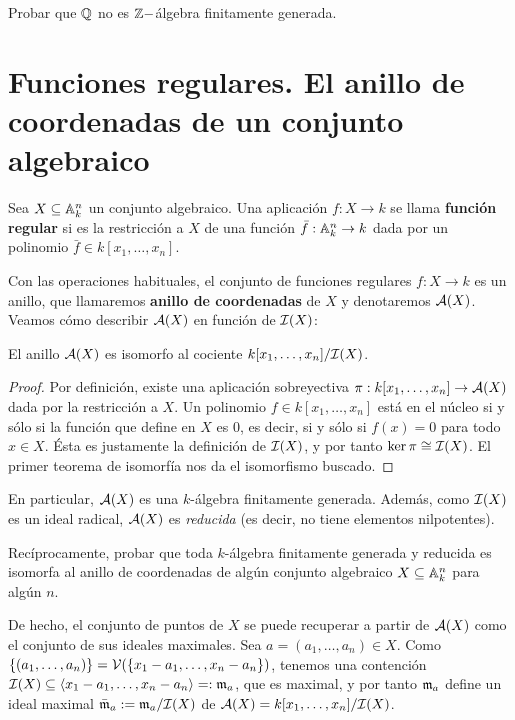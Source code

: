 \documentclass[ACGA.tex]{subfiles}
\begin{document}
\begin{ejer}
Probar que $\mathbb{Q}$ no es $\mathbb{Z}-$álgebra finitamente generada. 
\end{ejer}


\section[Funciones regulares]{Funciones regulares. El anillo de coordenadas de un conjunto algebraico}

\begin{defi}
 Sea $X\subseteq \mathbb{A}^n_k$ un conjunto algebraico. Una aplicación $f:X\to k$ se llama {\bf función regular} si es la restricción a $X$ de una función $\bar f:\mathbb{A}^n_k\to k$ dada por un polinomio $\bar f \in k[x_1,\ldots,x_n]$.
\end{defi}

Con las operaciones habituales, el conjunto de funciones regulares $f:X\to k$ es un anillo, que llamaremos {\bf anillo de coordenadas} de $X$ y denotaremos ${\mathcal A}(X)$. Veamos cómo describir ${\mathcal A}(X)$ en función de $\mathcal{I}(X)$:

\begin{prop}
 El anillo ${\mathcal A}(X)$ es isomorfo al cociente $k[x_1,\ldots,x_n]/\mathcal{I}(X)$.
\end{prop}

\begin{proof}
 Por definición, existe una aplicación sobreyectiva $\pi:k[x_1,\ldots,x_n]\to{\mathcal A}(X)$ dada por la restricción a $X$. Un polinomio $f\in k[x_1,\ldots,x_n]$ está en el núcleo si y sólo si la función que define en $X$ es $0$, es decir, si y sólo si $f(x)=0$ para todo $x\in X$. Ésta es justamente la definición de $\mathcal{I}(X)$, y por tanto $\ker\pi\cong\mathcal{I}(X)$. El primer teorema de isomorfía nos da el isomorfismo buscado.
\end{proof}

En particular, ${\mathcal A}(X)$ es una $k$-álgebra finitamente generada. Además, como $\mathcal{I}(X)$ es un ideal radical, ${\mathcal A}(X)$ es \emph{reducida} (es decir, no tiene elementos nilpotentes).

\begin{ejer}\label{full}
 Recíprocamente, probar que toda $k$-álgebra finitamente generada y reducida es isomorfa al anillo de coordenadas de algún conjunto algebraico $X\subseteq \mathbb{A}^n_k$ para algún $n$.
\end{ejer}

De hecho, el conjunto de puntos de $X$ se puede recuperar a partir de ${\mathcal A}(X)$ como el conjunto de sus ideales maximales. Sea $a=(a_1,\ldots,a_n)\in X$. Como $\{(a_1,\ldots,a_n)\}=\mathcal{V}(\{x_1-a_1,\ldots,x_n-a_n\})$, tenemos una contención $\mathcal{I}(X)\subseteq \langle x_1-a_1,\ldots,x_n-a_n\rangle =:{\mathfrak{m}}_a$, que es maximal, y por tanto ${\mathfrak{m}}_a$ define un ideal maximal $\bar{{\mathfrak{m}}}_a:={\mathfrak{m}}_a/\mathcal{I}(X)$ de ${\mathcal A}(X)=k[x_1,\ldots,x_n]/\mathcal{I}(X)$.
\end{document}
